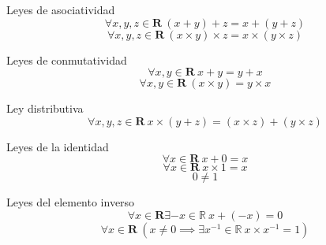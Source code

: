 
\begin{axiom}
	Leyes de asociatividad
	\begin{equation} \label{real_sumssoc}
		\forall x,y,z \in \mathbf{R}\ (x + y) + z = x + (y + z)
	\end{equation}
	\begin{equation} \label{real_mulassoc}
		\forall x,y,z \in \mathbf{R}\ (x \times y) \times z = x \times (y \times z)
	\end{equation}
\end{axiom}

\begin{axiom}
	Leyes de conmutatividad
	\begin{equation} \label{real_sumcomm}
		\forall x,y \in \mathbf{R}\ x + y = y + x
	\end{equation}
	\begin{equation} \label{real_mulcomm}
		\forall x,y \in \mathbf{R}\ (x \times y) = y \times x
	\end{equation}
\end{axiom}

\begin{axiom}
	Ley distributiva
	\begin{equation} \label{real_dist}
		\forall x,y,z \in \mathbf{R}\ x  \times (y + z) = (x \times z) + (y \times z)
	\end{equation}
\end{axiom}

\begin{axiom} \label{real_id}
	Leyes de la identidad
	\begin{equation} \label{eq_real_sumid}
		\forall x \in \mathbf{R}\ x  + 0 = x
	\end{equation}
	\begin{equation} \label{eq_real_mulid}
		\forall x \in \mathbf{R}\ x  \times 1 = x
	\end{equation}
	\begin{equation} \label{real_idneq}
		0 \neq 1
	\end{equation}
\end{axiom}

\begin{axiom} \label{real_inv}
	Leyes del elemento inverso
	\begin{equation} \label{eq_real_suminv}
		\forall x \in \mathbf{R} \exists -x \in \mathbb{R}\ x  + (-x) = 0
	\end{equation}
	\begin{equation} \label{eq_real_mulinv}
		\forall x \in \mathbf{R}\ (x \neq 0 \implies \exists x^{-1} \in \mathbb{R}\ x \times x^{-1} = 1)
	\end{equation}
\end{axiom}




